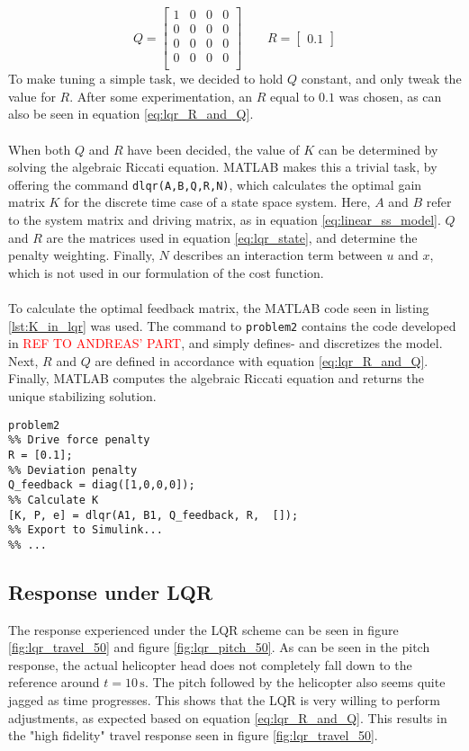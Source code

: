 \begin{equation}\label{eq:lqr_R_and_Q}
    Q = \begin{bmatrix}
        1 & 0 & 0 & 0\\
        0 & 0 & 0 & 0\\
        0 & 0 & 0 & 0\\
        0 & 0 & 0 & 0\\
    \end{bmatrix}\qquad
    R = \begin{bmatrix}
        0.1
    \end{bmatrix}
\end{equation}
To make tuning a simple task, we decided to hold $Q$ constant, and only tweak the value for $R$. After some experimentation, an $R$ equal to $0.1$ was chosen, as can also be seen in equation \ref{eq:lqr_R_and_Q}.\\
\\
When both $Q$ and $R$ have been decided, the value of $K$ can be determined by solving the algebraic Riccati equation. MATLAB makes this a trivial task, by offering the command \lstinline!dlqr(A,B,Q,R,N)!, which calculates the optimal gain matrix $K$ for the discrete time case of a state space system. Here, $A$ and $B$ refer to the system matrix and driving matrix, as in equation \ref{eq:linear_ss_model}. $Q$ and $R$ are the matrices used in equation \ref{eq:lqr_state}, and determine the penalty weighting. Finally, $N$ describes an interaction term between $u$ and $x$, which is not used in our formulation of the cost function.\\
\\
To calculate the optimal feedback matrix, the MATLAB code seen in listing \ref{lst:K_in_lqr} was used. The command to \lstinline!problem2! contains the code developed in \textcolor{red}{REF TO ANDREAS' PART}, and simply defines- and discretizes the model. Next, $R$ and $Q$ are defined in accordance with equation \ref{eq:lqr_R_and_Q}. Finally, MATLAB computes the algebraic Riccati equation and returns the unique stabilizing solution.
\begin{lstlisting}[caption=Computation of the optimal feedback matrix K.,label=lst:K_in_lqr]
%% Initialization and model definition
problem2
%% Drive force penalty
R = [0.1];
%% Deviation penalty
Q_feedback = diag([1,0,0,0]);
%% Calculate K
[K, P, e] = dlqr(A1, B1, Q_feedback, R,  []);
%% Export to Simulink...
%% ...
\end{lstlisting}
\subsection{Response under LQR}
The response experienced under the LQR scheme can be seen in figure \ref{fig:lqr_travel_50} and figure \ref{fig:lqr_pitch_50}. As can be seen in the pitch response, the actual helicopter head does not completely fall down to the reference around $t = 10\,\mathrm{s}$. The pitch followed by the helicopter also seems quite jagged as time progresses. This shows that the LQR is very willing to perform adjustments, as expected based on equation \ref{eq:lqr_R_and_Q}. This results in the "high fidelity" travel response seen in figure \ref{fig:lqr_travel_50}.\\
\\

